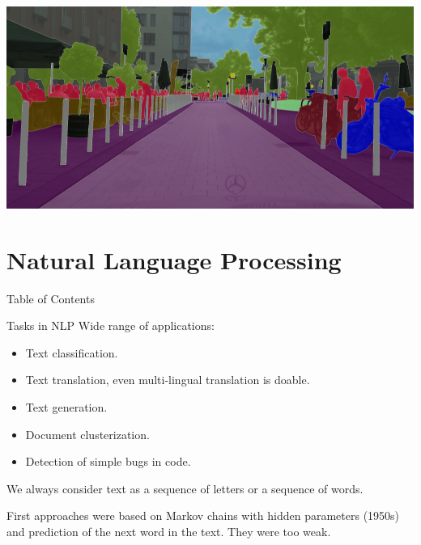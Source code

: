 \documentclass{beamer}
\theoremstyle{remark}
\begin{document}
\begin{frame}
    \begin{center}
    \includegraphics[width=\textwidth]{pictures/segmentation.png}
    \end{center}
\end{frame}

\section{Natural Language Processing}

\begin{frame}{Table of Contents}
    \tableofcontents[currentsection]
\end{frame}

\begin{frame}{Tasks in NLP}
    Wide range of applications:
    \begin{itemize}
        \item Text classification.
        \item Text translation, even multi-lingual translation is doable.
        \item Text generation.
        \item Document clusterization.
        \item Detection of simple bugs in code.
    \end{itemize}
    
    We always consider text as a sequence of letters or a sequence of words.\vspace{0.1in}
    
    First approaches were based on Markov chains with hidden parameters (1950s) and prediction of the next word in the text. They were too weak.
\end{frame}
\end{document}

